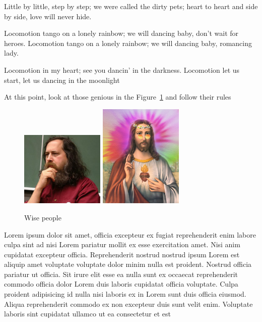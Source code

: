 \documentclass{article}
\begin{document}
Little by little, step by step; we were called the dirty pets; heart to heart
and side by side, love will never hide.

Locomotion tango on a lonely rainbow; we will dancing baby, don't wait for
heroes. Locomotion tango on a lonely rainbow; we will dancing baby, romancing
lady.

Locomotion in my heart; see you dancin' in the darkness. Locomotion let us
start, let us dancing in the moonlight

At this point, look at those genious in the Figure~\ref{fig:lords} and follow
their rules

\begin{figure}[ht]
  \begin{center}
    \includegraphics[width=4cm]{../../pictures/saint_ignucius.jpg}
    \includegraphics[width=4cm]{../../pictures/hippie_jesus.png}
  \end{center}
  \caption{Wise people}
  \label{fig:lords}
\end{figure}

Lorem ipsum dolor sit amet, officia excepteur ex fugiat reprehenderit enim
labore culpa sint ad nisi Lorem pariatur mollit ex esse exercitation amet. Nisi
anim cupidatat excepteur officia. Reprehenderit nostrud nostrud ipsum Lorem est
aliquip amet voluptate voluptate dolor minim nulla est proident. Nostrud
officia pariatur ut officia. Sit irure elit esse ea nulla sunt ex occaecat
reprehenderit commodo officia dolor Lorem duis laboris cupidatat officia
voluptate. Culpa proident adipisicing id nulla nisi laboris ex in Lorem sunt
duis officia eiusmod. Aliqua reprehenderit commodo ex non excepteur duis sunt
velit enim. Voluptate laboris sint cupidatat ullamco ut ea consectetur et est
\end{document}
